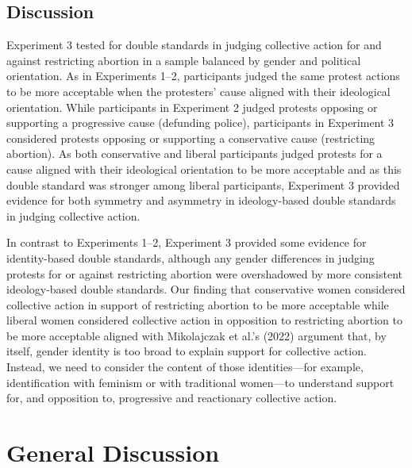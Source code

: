 \documentclass[12pt, letterpaper]{article}
\begin{document}
\hypertarget{discussion-2}{%
\subsection{Discussion}\label{discussion-2}}

Experiment 3 tested for double standards in judging collective action
for and against restricting abortion in a sample balanced by gender and
political orientation. As in Experiments 1--2, participants judged the
same protest actions to be more acceptable when the protesters' cause
aligned with their ideological orientation. While participants in
Experiment 2 judged protests opposing or supporting a progressive cause
(defunding police), participants in Experiment 3 considered protests
opposing or supporting a conservative cause (restricting abortion). As
both conservative and liberal participants judged protests for a cause
aligned with their ideological orientation to be more acceptable and as
this double standard was stronger among liberal participants, Experiment
3 provided evidence for both symmetry and asymmetry in ideology-based
double standards in judging collective action.

In contrast to Experiments 1--2, Experiment 3 provided some evidence for
identity-based double standards, although any gender differences in
judging protests for or against restricting abortion were overshadowed
by more consistent ideology-based double standards. Our finding that
conservative women considered collective action in support of
restricting abortion to be more acceptable while liberal women
considered collective action in opposition to restricting abortion to be
more acceptable aligned with Mikolajczak et al.'s (2022) argument that,
by itself, gender identity is too broad to explain support for
collective action. Instead, we need to consider the content of those
identities---for example, identification with feminism or with
traditional women---to understand support for, and opposition to,
progressive and reactionary collective action.

\hypertarget{general-discussion}{%
\section{General Discussion}\label{general-discussion}}
\end{document}
